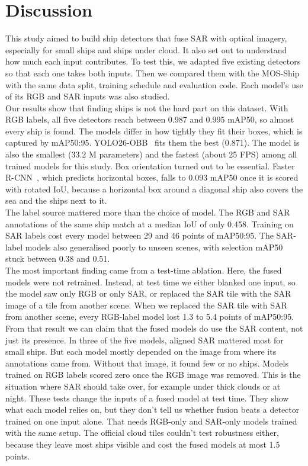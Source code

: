 \section{Discussion}
\label{sec:discussion}
This study aimed to build ship detectors that fuse SAR with optical imagery, especially for small ships and ships under cloud. It also set out to understand how much each input contributes. To test this, we adapted five existing detectors so that each one takes both inputs. Then we compared them with the MOS-Ship\cite{you2026multi} with the same data split, training schedule and evaluation code. Each model's use of its RGB and SAR inputs was also studied.\\

Our results show that finding ships is not the hard part on this dataset. With RGB labels, all five detectors reach between 0.987 and 0.995 mAP50, so almost every ship is found. The models differ in how tightly they fit their boxes, which is captured by mAP50:95. YOLO26-OBB~\cite{jocher2026ultralytics} fits them the best (0.871). The model is also the smallest (33.2 M parameters) and the fastest (about 25 FPS) among all trained models for this study. Box orientation turned out to be essential. Faster R-CNN~\cite{7485869}, which predicts horizontal boxes, falls to 0.093 mAP50 once it is scored with rotated IoU, because a horizontal box around a diagonal ship also covers the sea and the ships next to it.\\

The label source mattered more than the choice of model. The RGB and SAR annotations of the same ship match at a median IoU of only 0.458. Training on SAR labels cost every model between 29 and 46 points of mAP50:95. The SAR-label models also generalised poorly to unseen scenes, with selection mAP50 stuck between 0.38 and 0.51.\\

The most important finding came from a test-time ablation. Here, the fused models were not retrained. Instead, at test time we either blanked one input, so the model saw only RGB or only SAR, or replaced the SAR tile with the SAR image of a tile from another scene. When we replaced the SAR tile with SAR from another scene, every RGB-label model lost 1.3 to 5.4 points of mAP50:95. From that result we can claim that the fused models do use the SAR content, not just its presence. In three of the five models, aligned SAR mattered most for small ships. But each model mostly depended on the image from where its annotations came from. Without that image, it found few or no ships. Models trained on RGB labels scored zero once the RGB image was removed. This is the situation where SAR should take over, for example under thick clouds or at night. These tests change the inputs of a fused model at test time. They show what each model relies on, but they don't tell us whether fusion beats a detector trained on one input alone. That needs RGB-only and SAR-only models trained with the same setup. The official cloud tiles couldn't test robustness either, because they leave most ships visible and cost the fused models at most 1.5 points.\\

